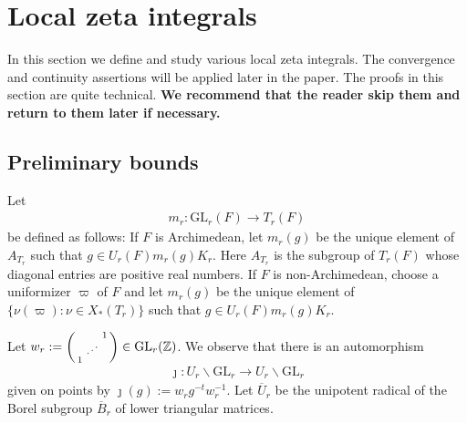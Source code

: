 \documentclass[12pt]{amsart}
\theoremstyle{remark}
\numberwithin{equation}{section}
\newcommand{\GL}{\mathrm{GL}}
\newcommand{\ZZ}{\mathbb{Z}}
\newcommand{\lto}{\longrightarrow}
\theoremstyle{definition}
\newenvironment{psmatrix}
  {\left(\begin{smallmatrix}}
  {\end{smallmatrix}\right)}
\numberwithin{equation}{subsection}
\begin{document}
\section{Local zeta integrals}

\label{sec:loc:zeta}


In this section we define and study various local zeta integrals.  The convergence and continuity assertions will be applied later in the paper. The proofs in this section are quite technical.  \textbf{We recommend that the reader skip them and return to them later if necessary.  }

\subsection{Preliminary bounds}


Let
\begin{align}  \label{mr}
    m_r:\GL_r(F)\lto T_r(F)
\end{align}
be defined as follows: If $F$ is Archimedean, let $m_r(g)$ be the unique element of $A_{T_r}$ such that $g \in U_r(F)m_r(g)K_r.$ Here $A_{T_r}$ is the subgroup of $T_r(F)$ whose diagonal entries are positive real numbers. If $F$ is non-Archimedean, choose a uniformizer $\varpi$ of $F$ and let $m_r(g)$ be the unique element of $\{\nu(\varpi): \nu \in X_*(T_r)\}$ such that 
$g \in U_r(F)m_r(g)K_r.$



Let $w_r:=\begin{psmatrix} & & 1 \\ & \textrm{\reflectbox{$\ddots$}} & \\ 1 & & \end{psmatrix} \in \GL_{r}(\ZZ)$. We observe that there is an  automorphism 
 \begin{align*} 
 \jmath :U_r \backslash \GL_r \lto U_r \backslash \GL_r
 \end{align*}
 given on points by $\jmath(g):=w_r g^{-t}w_r^{-1}.$
Let $\overline{U}_r$ be the unipotent radical of the Borel subgroup $\overline{B}_r$ of lower triangular matrices. 
\end{document}
